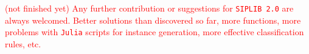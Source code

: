 \textcolor{red}{(not finished yet) Any further contribution or suggestions for \texttt{SIPLIB 2.0} are always welcomed. Better solutions than discovered so far, more functions, more problems with \texttt{Julia} scripts for instance generation, more effective classification rules, etc.}